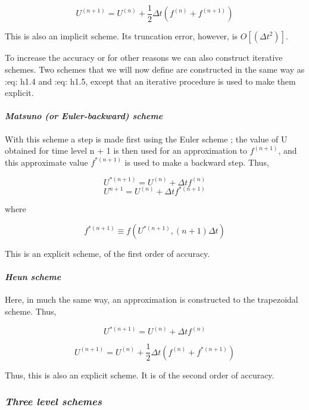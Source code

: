{\[U^{( n + 1 )} = U^{( n )} + \frac{1}{2}\Delta t\left( f^{( n )} + f^{( n + 1 )} \right)\]}

This is also an implicit scheme. Its truncation error, however, is
\(O\left[ \left( {\Delta t}^{2} \right) \right]\).

To increase the accuracy or for other reasons we can also construct
iterative schemes. Two schemes that we will now define are constructed
in the same way as :eq: {h1.4} and :eq: {h1.5}, except that an iterative
procedure is used to make them explicit.

\paragraph{\texorpdfstring{\emph{Matsuno (or Euler-backward)
scheme}}{Matsuno (or Euler-backward) scheme}}\label{matsuno-or-euler-backward-scheme}

With this scheme a step is made first using the Euler scheme ; the value
of U obtained for time level n + 1 is then used for an approximation to
\(f^{\left( n + 1 \right)}\), and this approximate value
\(f^{*\left( n + 1 \right)}\) is used to make a backward step. Thus,

{\[U^{*\left( n + 1 \right)} = U^{\left( n \right)} + \Delta t  f^{\left( n \right)}\]\[U^{n + 1} = U^{\left( n \right)} + \Delta t  {f^{*\left( n + 1 \right)}}\]}

where

\[{f^{*\left( n + 1 \right)}} \equiv f\left( U^{*\left( n + 1 \right)}, \left( n + 1 \right)\Delta t \right)\]

This is an explicit scheme, of the first order of accuracy.

\paragraph{\texorpdfstring{\emph{Heun
scheme}}{Heun scheme}}\label{heun-scheme}

Here, in much the same way, an approximation is constructed to the
trapezoidal scheme. Thus,

{\[U^{*\left( n + 1 \right)} = U^{\left( n \right)} + \Delta t  f^{\left( n \right)}\]}

\[U^{\left( n + 1 \right)} = U^{\left( n \right)} + \frac{1}{2}\Delta t\left( f^{\left( n \right)} + f^{*\left( n + 1 \right)} \right)\]

Thus, this is also an explicit scheme. It is of the second order of
accuracy.

\subsubsection{\texorpdfstring{\emph{Three level
schemes}}{Three level schemes}}\label{three-level-schemes}

